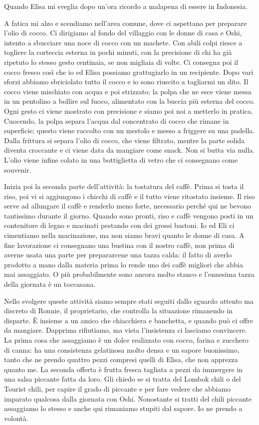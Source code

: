 Quando Elisa mi sveglia dopo un'ora ricordo a malapena di essere in Indonesia.

A fatica mi alzo e scendiamo nell'area comune, dove ci aspettano per preparare l'olio di cocco. Ci dirigiamo al fondo del villaggio con le donne di casa e Oshi, intento a sbucciare una noce di cocco con un machete. Con abili colpi riesce a togliere la corteccia esterna in pochi minuti, con la precisione di chi ha già ripetuto lo stesso gesto centinaia, se non migliaia di volte. Ci consegna poi il cocco fresco così che io ed Elisa possiamo grattugiarlo in un recipiente. Dopo vari sforzi abbiamo sbriciolato tutto il cocco e io sono riuscito a tagliarmi un dito. Il cocco viene mischiato con acqua e poi strizzato; la polpa che ne esce viene messa in un pentolino a bollire sul fuoco, alimentato con la buccia più esterna del cocco. Ogni gesto ci viene mostrato con precisione e siamo poi noi a metterlo in pratica. Cuocendo, la polpa separa l'acqua dal concentrato di cocco che rimane in superficie; questo viene raccolto con un mestolo e messo a friggere su una padella. Dalla frittura si separa l'olio di cocco, che viene filtrato, mentre la parte solida diventa croccante e ci viene data da mangiare come snack. Non si butta via nulla. L'olio viene infine colato in una bottiglietta di vetro che ci consegnano come souvenir.

Inizia poi la seconda parte dell'attività: la tostatura del caffè. Prima si tosta il riso, poi vi si aggiungono i chicchi di caffè e il tutto viene ritostato insieme. Il riso serve ad allungare il caffè e renderlo meno forte, necessario perché qui ne bevono tantissimo durante il giorno. Quando sono pronti, riso e caffè vengono posti in un contenitore di legno e macinati pestando con dei grossi bastoni. Io ed Eli ci cimentiamo nella macinazione, ma non siamo bravi quanto le donne di casa. A fine lavorazione ci consegnano una bustina con il nostro caffè, non prima di averne usata una parte per prepararcene una tazza calda: il fatto di averlo prodotto a mano dalla materia prima lo rende uno dei caffè migliori che abbia mai assaggiato. O più probabilmente sono ancora molto stanco e l'ennesima tazza della giornata è un toccasana.

Nello svolgere queste attività siamo sempre stati seguiti dallo sguardo attento ma discreto di Ronnie, il proprietario, che controlla la situazione rimanendo in disparte. È insieme a un amico che chiacchiera e banchetta, e quando può ci offre da mangiare. Dapprima rifiutiamo, ma vista l'insistenza ci lasciamo convincere. La prima cosa che assaggiamo è un dolce realizzato con cocco, farina e zucchero di canna: ha una consistenza gelatinosa molto densa e un sapore buonissimo, tanto che ne prendo quattro pezzi compresi quelli di Elisa, che non apprezza quanto me. La seconda offerta è frutta fresca tagliata a pezzi da immergere in una salsa piccante fatta da loro. Gli chiedo se si tratta del Lombok chili o del Tourist chili, per capire il grado di piccante e per fare vedere che abbiamo imparato qualcosa dalla giornata con Oshi. Nonostante si tratti del chili piccante assaggiamo lo stesso e anche qui rimaniamo stupiti dal sapore. Io ne prendo a volontà.

